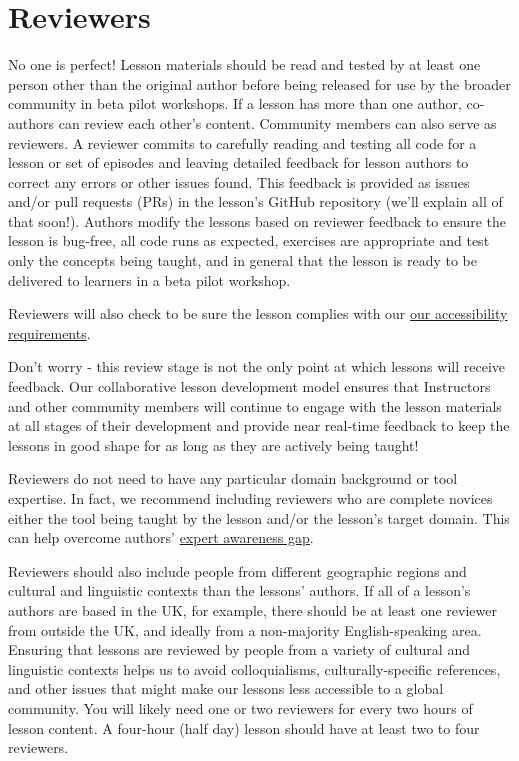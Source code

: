 \documentclass[]{book}
\begin{document}
\hypertarget{reviewers}{%
\section{Reviewers}\label{reviewers}}

No one is perfect! Lesson materials should be read and tested by at least
one person other than the original author before being released for use by the broader community in beta pilot workshops.
If a lesson has more than one author, co-authors can review each other's content.
Community members can also serve as reviewers. A reviewer commits to carefully
reading and testing all code for a lesson or set of episodes and leaving detailed
feedback for lesson authors to correct any errors or other issues found. This feedback is
provided as issues and/or pull requests (PRs) in the lesson's GitHub repository
(we'll explain all of that soon!). Authors modify the lessons based on reviewer feedback to ensure the
lesson is bug-free, all code runs as expected, exercises are appropriate and test
only the concepts being taught, and in general that the lesson is ready to be
delivered to learners in a beta pilot workshop.

Reviewers will also check to be sure the lesson complies with our
\href{link}{our accessibility requirements}.

Don't worry - this review stage is not the only point at which lessons will
receive feedback. Our collaborative lesson development model ensures that
Instructors and other community members will continue to engage with the lesson
materials at all stages of their development and provide near real-time feedback
to keep the lessons in good shape for as long as they are actively being taught!

Reviewers do not need to have any particular domain background or tool expertise.
In fact, we recommend including reviewers who are complete novices either
the tool being taught by the lesson and/or the lesson's target domain. This can
help overcome authors' \href{https://carpentries.github.io/instructor-training/03-expertise/index.html\#expertise-and-teaching}{expert awareness gap}.

Reviewers should also include people from different geographic regions and
cultural and linguistic contexts than the lessons' authors. If all of
a lesson's authors are based in the UK, for example, there should be at least
one reviewer from outside the UK, and ideally from a non-majority English-speaking
area. Ensuring that lessons are reviewed by people from a variety of cultural and linguistic
contexts helps us to avoid colloquialisms, culturally-specific references, and other issues that might make our lessons less accessible to a global community. You will likely need one or two reviewers for every
two hours of lesson content. A four-hour (half day) lesson should have at least two to four reviewers.
\end{document}
